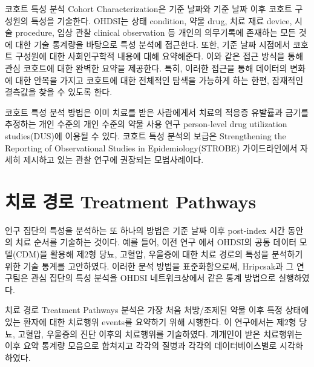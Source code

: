 \documentclass[10.5pt]{book}
\theoremstyle{definition}
\theoremstyle{definition}
\theoremstyle{definition}
\theoremstyle{remark}
\begin{document}
코호트 특성 분석 Cohort Characterization은 기준 날짜와 기준 날짜 이후
코호트 구성원의 특성을 기술한다. OHDSI는 상태 condition, 약물 drug, 치료
재료 device, 시술 procedure, 임상 관찰 clinical observation 등 개인의
의무기록에 존재하는 모든 것에 대한 기술 통계량을 바탕으로 특성 분석에
접근한다. 또한, 기준 날짜 시점에서 코호트 구성원에 대한 사회인구학적
내용에 대해 요약해준다. 이와 같은 접근 방식을 통해 관심 코호트에 대한
완벽한 요약을 제공한다. 특히, 이러한 접근을 통해 데이터의 변화에 대한
안목을 가지고 코호트에 대한 전체적인 탐색을 가능하게 하는 한편, 잠재적인
결측값을 찾을 수 있도록 한다.

코호트 특성 분석 방법은 이미 치료를 받은 사람에게서 치료의 적응증
유발률과 금기를 추정하는 개인 수준의 개인 수준의 약물 사용 연구
person-level drug utilization studies(DUS)에 이용될 수 있다. 코호트 특성
분석의 보급은 Strengthening the Reporting of Observational Studies in
Epidemiology(STROBE) 가이드라인에서 자세히 제시하고 있는 관찰 연구에
권장되는 모범사례이다. \citep{VONELM2008344}

\section{치료 경로 Treatment Pathways}\label{--treatment-pathways}

인구 집단의 특성을 분석하는 또 하나의 방법은 기준 날짜 이후 post-index
시간 동안의 치료 순서를 기술하는 것이다. 예를 들어, 이전 연구
\citep{Hripcsak7329} 에서 OHDSI의 공통 데이터 모델(CDM)을 활용해 제2형
당뇨, 고혈압, 우울증에 대한 치료 경로의 특성을 분석하기 위한 기술 통계를
고안하였다. 이러한 분석 방법을 표준화함으로써, Hripcsak과 그 연구팀은
관심 집단의 특성 분석을 OHDSI 네트워크상에서 같은 통계 방법으로
실행하였다. 

치료 경로 Treatment Pathways 분석은 가장 처음 처방/조제된 약물 이후 특정
상태에 있는 환자에 대한 치료행위 events를 요약하기 위해 시행한다. 이
연구에서는 제2형 당뇨, 고혈압, 우울증의 진단 이후의 치료행위를
기술하였다. 개개인이 받은 치료행위는 이후 요약 통계량 모음으로 합쳐지고
각각의 질병과 각각의 데이터베이스별로 시각화하였다.
\end{document}
